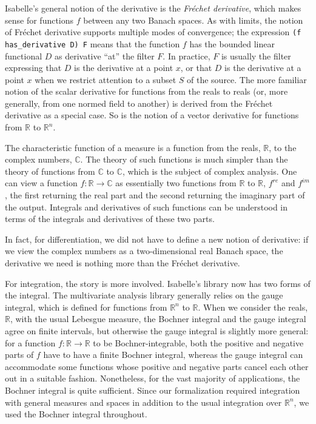 \documentclass{svjour3}
\newcommand{\RR}{\mathbb{R}}
\newcommand{\CC}{\mathbb{C}}
\begin{document}
Isabelle's general notion of the derivative is the \emph{Fr\'echet derivative}, which makes sense for functions $f$ between any two Banach spaces. As with limits, the notion of Fr\'echet derivative supports multiple modes of convergence; the expression \texttt{(f has\_derivative D) F} means that the function $f$ has the bounded linear functional $D$ as derivative ``at'' the filter $F$. In practice, $F$ is usually the filter expressing that $D$ is the derivative at a point $x$, or that $D$ is the derivative at a point $x$ when we restrict attention to a subset $S$ of the source. The more familiar notion of the scalar derivative for functions from the reals to reals (or, more generally, from one normed field to another) is derived from the Fr\'echet derivative as a special case. So is the notion of a vector derivative for functions from $\RR$ to $\RR^n$.

The characteristic function of a measure is a function from the reals, $\RR$, to the complex numbers, $\CC$. The theory of such functions is much simpler than the theory of functions from $\CC$ to $\CC$, which is the subject of complex analysis. One can view a function $f : \RR \to \CC$ as essentially two functions from $\RR$ to $\RR$, $f^\mathit{re}$ and $f^\mathit{im}$, the first returning the real part and the second returning the imaginary part of the output. Integrals and derivatives of such functions can be understood in terms of the integrals and derivatives of these two parts.

In fact, for differentiation, we did not have to define a new notion of derivative: if we view the complex numbers as a two-dimensional real Banach space, the derivative we need is nothing more than the Fr\'echet derivative.

For integration, the story is more involved. Isabelle's library now has two forms of the integral. The multivariate analysis library generally relies on the gauge integral, which is defined for functions from $\RR^n$ to $\RR$. When we consider the reals, $\RR$, with the usual Lebesgue measure, the Bochner integral and the gauge integral agree on finite intervals, but otherwise the gauge integral is slightly more general: for a function $f : \RR \to \RR$ to be Bochner-integrable, both the positive and negative parts of $f$ have to have a finite Bochner integral, whereas the gauge integral can accommodate some functions whose positive and negative parts cancel each other out in a suitable fashion. Nonetheless, for the vast majority of applications, the Bochner integral is quite sufficient. Since our formalization required integration with general measures and spaces in addition to the usual integration over $\RR^n$, we used the Bochner integral throughout.
\end{document}
